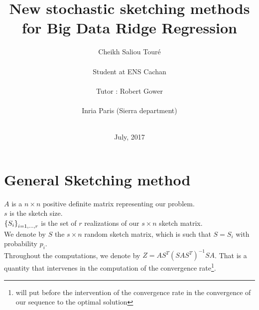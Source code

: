 


\usepackage[colorinlistoftodos,bordercolor=orange,backgroundcolor=orange!20,linecolor=orange,textsize=scriptsize]{todonotes}
\newcommand{\rob}[1]{\todo[inline]{\textbf{Robert: }#1}}

\title{New stochastic sketching methods for Big Data Ridge Regression}
\author{Cheikh Saliou Tour\'e \\ \\
Student at ENS Cachan\\\\
Tutor : Robert Gower \\ \\
Inria Paris (Sierra department)\\\\ }




\date{July, 2017}




\renewcommand\bibname{References}
%
%
%
%
\tableofcontents
\newpage

\chapter{General Sketching method}

$A$ is a $n \times n$ positive definite matrix representing our problem.\\ 
$s$ is the sketch size.\\
 $\left\{S_{i}\right\}_{i=1,\dots,r}$ is the set of $r$ realizations of our $s\times n$ sketch matrix.\\
We denote by $S$ the $s\times n$ random sketch matrix, which is such that $S = S_{i}$ with probability $p_{i}$. \\ 
 
Throughout the computations, we denote by $Z = A S^{T} (S A S^{T})^{-1} S A$. That is a quantity that intervenes in the computation of the convergence rate\footnote{will put before the intervention of the convergence rate in the convergence of our sequence to the optimal solution }.\\



